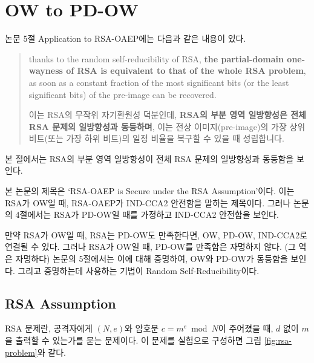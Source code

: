 \section{OW to PD-OW}

논문 5절 Application to RSA-OAEP에는 다음과 같은 내용이 있다.

\begin{quote}
    \noindent
    thanks to the random self-reducibility of RSA, \textbf{the partial-domain
    one-wayness of RSA is equivalent to that of the whole RSA problem}, as soon
    as a constant fraction of the most significant bits (or the least
    significant bits) of the pre-image can be recovered.
    
    이는 RSA의 무작위 자기환원성 덕분인데, \textbf{RSA의 부분 영역 일방향성은
    전체 RSA 문제의 일방향성과 동등하며}, 이는 전상 이미지(pre-image)의 가장
    상위 비트(또는 가장 하위 비트)의 일정 비율을 복구할 수 있을 때 성립합니다.
\end{quote}

본 절에서는 RSA의 부분 영역 일방향성이 전체 RSA 문제의 일방향성과 동등함을 보인다.

\begin{memo}
    본 논문의 제목은 `RSA-OAEP is Secure under the RSA Assumption'이다. 이는
    RSA가 OW일 때, RSA-OAEP가 IND-CCA2 안전함을 말하는 제목이다. 그러나 논문의
    4절에서는 RSA가 PD-OW일 때를 가정하고 IND-CCA2 안전함을 보인다.

    만약 RSA가 OW일 때, RSA는 PD-OW도 만족한다면, OW, PD-OW, IND-CCA2로
    연결될 수 있다. 그러나 RSA가 OW일 때, PD-OW를 만족함은 자명하지 않다. (그
    역은 자명하다) 논문의 5절에서는 이에 대해 증명하여, OW와 PD-OW가 동등함을
    보인다. 그리고 증명하는데 사용하는 기법이 Random Self-Reducibility이다.
\end{memo}

\subsection{RSA Assumption}
RSA 문제란, 공격자에게 $(N, e)$와 암호문 $c = m^e \bmod N$이 주어졌을 때, $d$
없이 $m$을 출력할 수 있는가를 묻는 문제이다. 이 문제를 실험으로 구성하면 그림
\ref{fig:rsa-problem}와 같다.

\newcommand{\RSA}{\textsf{RSA}}

